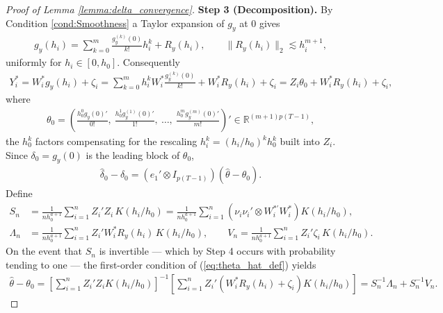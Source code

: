 \documentclass{article}
\newcommand{\normm}[1]{\lVert#1\rVert}
\newcommand{\R}{\mathbb{R}}
\begin{document}
\begin{appendices}
\begin{proof}[Proof of Lemma \ref{lemma:delta_convergence}]
    \textbf{Step 3 (Decomposition).}
    By Condition \ref{cond:Smoothness} a Taylor expansion of $g_y$ at $0$ gives
    \begin{align*}
        g_y(h_i) = \sum_{k=0}^m \frac{g_y^{(k)}(0)}{k!}h_i^k + R_{y}(h_i),
        \qquad \normm{R_{y}(h_i)}_2\lesssim h_i^{m+1},
    \end{align*}
    uniformly for $h_i\in[0,h_0]$. Consequently
    \begin{align*}
        Y_i^{*} = W_i^{*}g_y(h_i) + \zeta_i
        = \sum_{k=0}^m h_i^k W_i^{*}\frac{g_y^{(k)}(0)}{k!} + W_i^{*}R_{y}(h_i) + \zeta_i
        = Z_i\theta_0 + W_i^{*}R_{y}(h_i) + \zeta_i,
    \end{align*}
    where
    \begin{align*}
        \theta_0 = \left(\frac{h_0^{0}g_y(0)'}{0!},\ \frac{h_0^{1}g_y^{(1)}(0)'}{1!},\
        \dots,\ \frac{h_0^{m}g_y^{(m)}(0)'}{m!}\right)'\in\R^{(m+1)p(T-1)},
    \end{align*}
    the $h_0^k$ factors compensating for the rescaling $h_i^k=(h_i/h_0)^k h_0^k$
    built into $Z_i$. Since $\delta_0=g_y(0)$ is the leading block of $\theta_0$,
    \begin{align}\label{eq:delta_estimation_equivalence}
        \hat{\delta}_0-\delta_0
        = \left(e_1'\otimes I_{p(T-1)}\right)(\hat{\theta}-\theta_0).
    \end{align}
    Define
    \begin{align*}
        S_n &= \frac{1}{nh_0^{a+1}}\sum_{i=1}^n Z_i'Z_i\,K(h_i/h_0)
            = \frac{1}{nh_0^{a+1}}\sum_{i=1}^n
            \left(\nu_i\nu_i'\otimes W_i^{*\prime}W_i^{*}\right)K(h_i/h_0),\\
        \Lambda_n &= \frac{1}{nh_0^{a+1}}\sum_{i=1}^n Z_i'W_i^{*}R_{y}(h_i)\,K(h_i/h_0),
        \qquad
        V_n = \frac{1}{nh_0^{a+1}}\sum_{i=1}^n Z_i'\zeta_i\,K(h_i/h_0).
    \end{align*}
    On the event that $S_n$ is invertible — which by Step 4 occurs with probability
    tending to one — the first-order condition of (\ref{eq:theta_hat_def}) yields
    \begin{align}\label{eq:theta_decomposition}
        \hat{\theta}-\theta_0
        = \left[\sum_{i=1}^n Z_i'Z_i K(h_i/h_0)\right]^{-1}
        \left[\sum_{i=1}^n Z_i'\left(W_i^{*}R_{y}(h_i)+\zeta_i\right)K(h_i/h_0)\right]
        = S_n^{-1}\Lambda_n + S_n^{-1}V_n .
    \end{align}


\end{proof}
\end{appendices}
\end{document}
